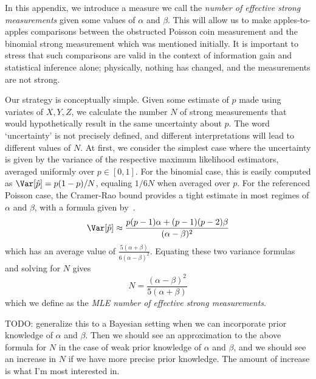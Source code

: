 \documentclass{quantumarticle}
\begin{document}
In this appendix, we introduce a measure we call the \textit{number of effective strong measurements} 
given some values of $\alpha$ and $\beta$.
This will allow us to make apples-to-apples comparisons between the obstructed
Poisson coin measurement and the binomial strong measurement which was mentioned initially.
It is important to stress that such comparisons are valid in the context of 
information gain and statistical inference alone; physically, nothing 
has changed, and the measurements are not strong.

Our strategy is conceptually simple. Given some estimate of $p$ 
made using variates of $X,Y,Z$, we calculate the number $N$ of strong measurements 
that would hypothetically result in the same uncertainty about $p$.
The word `uncertainty' is not precisely defined, and different interpretations 
will lead to different values of $N$.
At first, we consider the simplest case where the uncertainty is given by the variance 
of the respective maximum likelihood estimators, averaged uniformly over $p\in[0,1]$.
For the binomial case, this is easily computed as $\Var[\hat{p}]=p(1-p)/N$, equaling $1/6N$ when 
averaged over $p$.
For the referenced Poisson case, the Cramer-Rao bound provides a tight estimate 
in most regimes of $\alpha$ and $\beta$, with a formula given by~\citep{hincks_statistical_2017}.
\begin{equation}
    \Var[\hat{p}]\approx\frac{p(p-1)\alpha+(p-1)(p-2)\beta}{(\alpha-\beta)^2}
\end{equation}
which has an average value of $\frac{5(\alpha+\beta)}{6(\alpha-\beta)^2}$.
Equating these two variance formulas and solving for $N$ gives 
\begin{equation}
    N=\frac{(\alpha-\beta)^2}{5(\alpha+\beta)}
\end{equation}
which we define as the \textit{MLE number of effective strong measurements}.

TODO: generalize this to a Bayesian setting when we can incorporate prior
knowledge of $\alpha$ and $\beta$.
Then we should see an approximation to the above formula for $N$ in the case
of weak prior knowledge of $\alpha$ and $\beta$, and we should see an increase 
in $N$ if we have more precise prior knowledge.
The amount of increase is what I'm most interested in.
\end{document}
